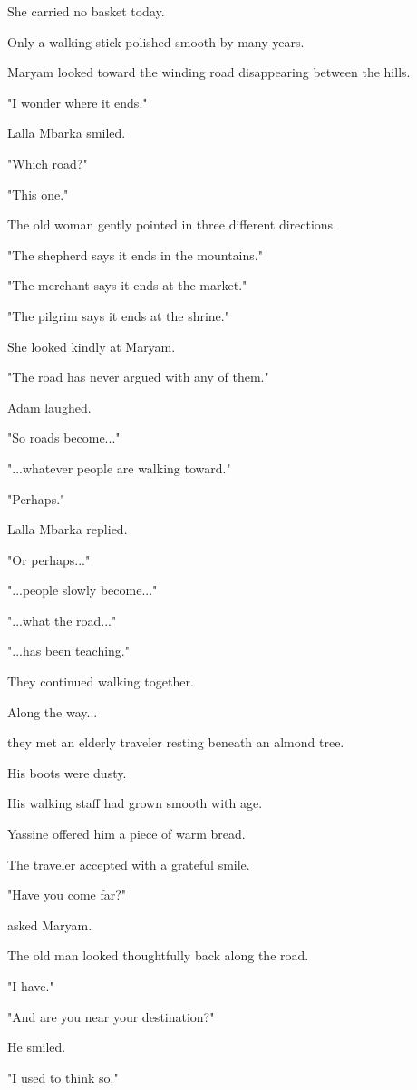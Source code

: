 \documentclass[12pt,openany]{book}
\begin{document}
She carried no basket today.

Only a walking stick polished smooth by many years.

Maryam looked toward the winding road disappearing between the hills.

"I wonder where it ends."

Lalla Mbarka smiled.

"Which road?"

"This one."

The old woman gently pointed in three different directions.

"The shepherd says it ends in the mountains."

"The merchant says it ends at the market."

"The pilgrim says it ends at the shrine."

She looked kindly at Maryam.

"The road has never argued with any of them."

Adam laughed.

"So roads become..."

"...whatever people are walking toward."

"Perhaps."

Lalla Mbarka replied.

"Or perhaps..."

"...people slowly become..."

"...what the road..."

"...has been teaching."

They continued walking together.

Along the way...

they met an elderly traveler resting beneath an almond tree.

His boots were dusty.

His walking staff had grown smooth with age.

Yassine offered him a piece of warm bread.

The traveler accepted with a grateful smile.

"Have you come far?"

asked Maryam.

The old man looked thoughtfully back along the road.

"I have."

"And are you near your destination?"

He smiled.

"I used to think so."
\end{document}
